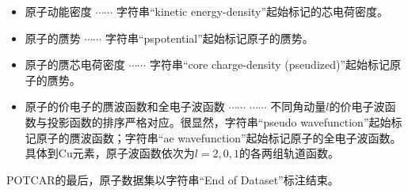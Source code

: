 \begin{itemize}
{{	 %
}}
$\cdots\cdots$
{\fontsize{7.2pt}{5.2pt}\selectfont{
}}
类似地，字符串``\textrm{core charge-density}''起始标记的芯电荷密度。  
\item 原子动能密度
{\fontsize{7.2pt}{5.2pt}\selectfont{
}}
$\cdots\cdots$
{\fontsize{7.2pt}{5.2pt}\selectfont{
}}
字符串``\textrm{kinetic energy-density}''起始标记的芯电荷密度。  
\item 原子的赝势
{\fontsize{7.2pt}{5.2pt}\selectfont{
}}
$\cdots\cdots$
{\fontsize{7.2pt}{5.2pt}\selectfont{
}}
字符串``pspotential''起始标记原子的赝势。  
\item 原子的赝芯电荷密度
{\fontsize{7.2pt}{5.2pt}\selectfont{
}}
$\cdots\cdots$
{\fontsize{7.2pt}{5.2pt}\selectfont{
}}
字符串``\textrm{core charge-density (pseudized)}''起始标记原子的赝势。
\item 原子的价电子的赝波函数和全电子波函数
{\fontsize{7.2pt}{5.2pt}\selectfont{
}}
$\cdots\cdots$
{\fontsize{7.2pt}{5.2pt}\selectfont{
}}
$\cdots\cdots$
{\fontsize{7.2pt}{5.2pt}\selectfont{
}}
不同角动量$l$的价电子波函数与投影函数的排序严格对应。很显然，字符串``\textrm{pseudo wavefunction}''起始标记原子的赝波函数；字符串``\textrm{ae wavefunction}''起始标记原子的全电子波函数。具体到\textrm{Cu}元素，原子波函数依次为$l=2, 0, 1$的各两组轨道函数。
\end{itemize}
\textrm{POTCAR}的最后，原子数据集以字符串``End of Dataset''标注结束。
